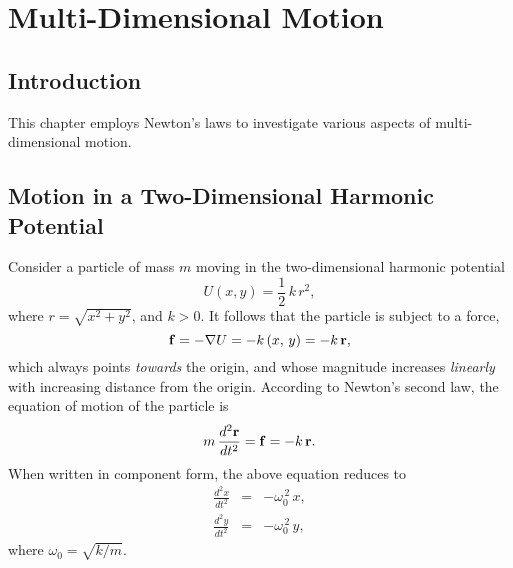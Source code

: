 \chapter{Multi-Dimensional Motion}
\section{Introduction}
This chapter employs Newton's laws to 
investigate various aspects  of multi-dimensional motion. 

\section{Motion in a Two-Dimensional Harmonic Potential}\label{sn1}
Consider a particle of mass $m$ moving in 
the two-dimensional harmonic potential
\begin{equation}\label{e5.1}
U(x,y) = \frac{1}{2}\,k\,r^2,
\end{equation} 
where $r=\sqrt{x^2+y^2}$, and $k>0$. It follows that the particle is subject to
a force,
\begin{equation}
{\bf f} = - \nabla U = -k\,(x,\, y) = - k\,{\bf r},
\end{equation}
which always points {\em towards}\/ the origin, and whose magnitude increases {\em linearly}\/ with
increasing distance from the origin. According to Newton's second law, the
equation of motion of the particle is 
\begin{equation}
m\,\frac{d^2{\bf r}}{dt^2} = {\bf f} = - k\,{\bf r}.
\end{equation}
When written in component form, the above equation reduces to
\begin{eqnarray}\label{e5.4}
\frac{d^2 x}{d t^2} &=& - \omega_0^{\,2}\,x,\\[0.5ex]
\frac{d^2 y}{d t^2} &=& - \omega_0^{\,2}\,y,\label{e5.5}
\end{eqnarray}
where $\omega_0 = \sqrt{k/m}$. 

